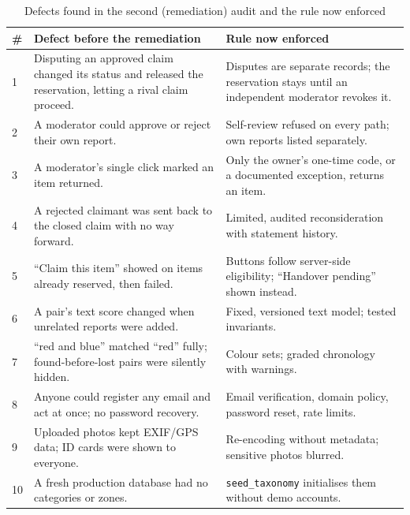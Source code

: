 \documentclass[12pt,a4paper,oneside]{report}
\newcommand{\code}[1]{\texttt{#1}}
\begin{document}
\begin{table}[!tbp]
\centering\small
\caption{Defects found in the second (remediation) audit and the rule now enforced}
\begin{tabularx}{\textwidth}{P{4mm}X X}
\toprule
\# & Defect before the remediation & Rule now enforced\\
 & Disputing an approved claim changed its status and released the reservation, letting a rival claim proceed. & Disputes are separate records; the reservation stays until an independent moderator revokes it.\\
2 & A moderator could approve or reject their own report. & Self-review refused on every path; own reports listed separately.\\
3 & A moderator's single click marked an item returned. & Only the owner's one-time code, or a documented exception, returns an item.\\
4 & A rejected claimant was sent back to the closed claim with no way forward. & Limited, audited reconsideration with statement history.\\
5 & ``Claim this item'' showed on items already reserved, then failed. & Buttons follow server-side eligibility; ``Handover pending'' shown instead.\\
6 & A pair's text score changed when unrelated reports were added. & Fixed, versioned text model; tested invariants.\\
7 & ``red and blue'' matched ``red'' fully; found-before-lost pairs were silently hidden. & Colour sets; graded chronology with warnings.\\
8 & Anyone could register any email and act at once; no password recovery. & Email verification, domain policy, password reset, rate limits.\\
9 & Uploaded photos kept EXIF/GPS data; ID cards were shown to everyone. & Re-encoding without metadata; sensitive photos blurred.\\
10 & A fresh production database had no categories or zones. & \code{seed\_taxonomy} initialises them without demo accounts.\\
\bottomrule
\end{tabularx}
\end{table}
\end{document}
